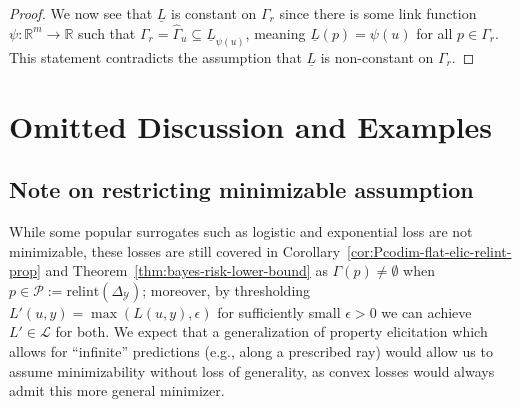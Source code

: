 \documentclass{article} %
\newcommand{\Comments}{0}
\newcommand{\mytodo}[2]{\ifnum\Comments=1%
	\todo[linecolor=#1!80!black,backgroundcolor=#1,bordercolor=#1!80!black]{#2}\fi}
\newcommand{\botodo}[1]{\mytodo{blue!20!white}{[Bo: #1]}}
\newcommand{\btw}[1]{}%
\newcommand{\reals}{\mathbb{R}}
\newcommand{\simplex}{\Delta_\Y}
\newcommand{\relint}[1]{\mathrm{relint}(#1)}
\newcommand{\eliccvx}{\mathrm{elic}_\mathrm{cvx}}
\renewcommand{\L}{\mathcal{L}}
\renewcommand{\P}{\mathcal{P}}
\newcommand{\Y}{\mathcal{Y}}
\newcommand{\lbar}{\underline{L}} %
\begin{document}
\begin{proof}
  We now see that $\lbar$ is constant on $\Gamma_r$ since there is some link function $\psi:\reals^m\to\reals$ such that $\Gamma_r = \hat\Gamma_u \subseteq \lbar_{\psi(u)}$, meaning $\lbar(p) = \psi(u)$ for all $p\in\Gamma_r$.
  This statement contradicts the assumption that $\lbar$ is non-constant on $\Gamma_r$.
\end{proof}



%
%

\section{Omitted Discussion and Examples}\label{app:omitted}

\subsection{Note on restricting minimizable assumption}\label{app:minnable-assumption}
While some popular surrogates such as logistic and exponential loss are not minimizable, these losses are still covered in Corollary~\ref{cor:Pcodim-flat-elic-relint-prop} and Theorem~\ref{thm:bayes-risk-lower-bound} as $\Gamma(p) \neq \emptyset$ when $p\in\P := \relint\simplex$; moreover, by thresholding $L'(u,y) = \max(L(u,y),\epsilon)$ for sufficiently small $\epsilon>0$ we can achieve $L'\in\L$ for both.
We expect that a generalization of property elicitation which allows for ``infinite'' predictions (e.g., along a prescribed ray) would allow us to assume minimizability without loss of generality, as convex losses would always admit this more general minimizer.
\btw{Some refs / related work commented out here.  I think not as relevant as elicitation complexity.}
\end{document}
